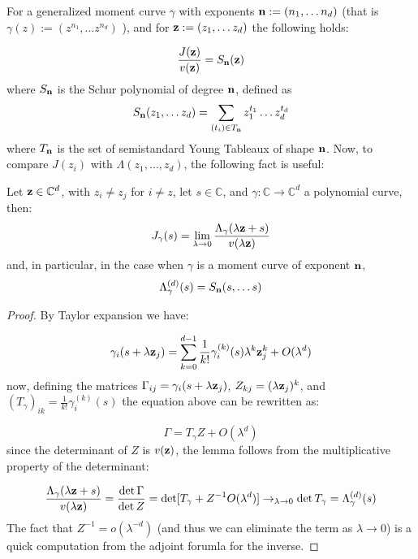 	For a generalized moment curve $\gamma$ with exponents ${\bf n}:= (n_1, \dots n_d)$ (that is $\gamma(z):= (z^{n_1}, \dots z^{n_d})$ ), and for ${\bf z} := (z_1, \dots z_d)$ the following holds:

	\begin{equation}
		\frac{J({\bf z})}{v({\bf z})} = S_{\bf n} (\bf z)
	\end{equation}
	where $S_{\bf n}$ is the Schur polynomial of degree $\bf n$, defined as
	\begin{equation}
	S_{\bf n}(z_1, \dots z_d) = \sum_{(t_i) \in T_{\bf n}} z_1^{t_1}\dots z_d^{t_d}	
	\end{equation}	
	where $T_{\bf n}$ is the set of semistandard Young Tableaux of shape $\bf n$. Now, to compare $J(z_i)$ with $\Lambda(z_1, \dots, z_d)$, the following fact is useful:

	\begin{lemma}
	\label{lem:det_is_limit}
		Let ${\bf z}\in \mathbb C^d$, with $z_i\neq z_j$ for $i\neq z$, let $s\in \mathbb C$, and $\gamma:\mathbb C\to \mathbb C^d$ a polynomial curve, then:
		\begin{equation}
		J_\gamma(s) = \lim_{\lambda\to 0} \frac{\Lambda_\gamma(\lambda {\bf z}+ s)}{v(\lambda {\bf z})} 
		\end{equation}  
		and, in particular, in the case when $\gamma$ is a moment curve of exponent $\bf n$,
		\begin{equation}
		\label{eq:det_is_schur}
			\Lambda^{(d)}_\gamma(s) = S_{\bf n}(s, \dots s)
		\end{equation}
	\end{lemma}

	\begin{proof}
		By Taylor expansion we have:

		\begin{equation}
			\gamma_i(s+ \lambda {\bf z}_j) =  \sum_{k=0}^{d-1} \frac 1 {k!}\gamma_i^{(k)}(s) \lambda^k {\bf z}_j ^k + O(\lambda^d)
		\end{equation}
		now, defining the matrices $\Gamma_{ij} = \gamma_i(s+ \lambda {\bf z}_j)$, $ { Z}_{kj} =  (\lambda {\bf z}_j) ^k$, and $(T_\gamma)_{ik} = \frac 1 {k!}\gamma_i^{(k)}(s) $ the equation above can be rewritten as:

		\begin{equation}
			\Gamma = T_\gamma Z + O(\lambda^d)
		\end{equation}
		since the determinant of $Z$ is $v({\bf z})$, the lemma follows from the multiplicative property of the determinant:

		\begin{equation}
			\frac{\Lambda_\gamma(\lambda {\bf z}+ s)}{v(\lambda {\bf z})} = 
			\frac{\det \Gamma}{\det Z} =  \det [T_\gamma +  Z^{-1}O(\lambda^d)] \to_{\lambda \to 0} \det T_\gamma =  \Lambda^{(d)}_\gamma(s)
		\end{equation}
		The fact that $Z^{-1}= o(\lambda^{-d})$ (and thus we can eliminate the term as $\lambda\to 0$) is a quick computation from the adjoint forumla for the inverse.
	\end{proof}

